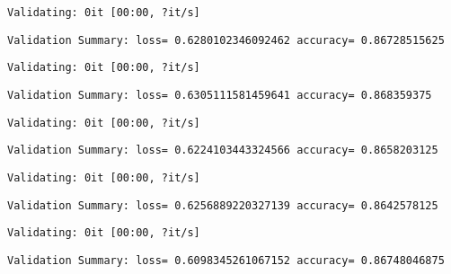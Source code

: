 \documentclass[11pt]{article}
\begin{document}
    
    \begin{Verbatim}[commandchars=\\\{\}]
Validating: 0it [00:00, ?it/s]
    \end{Verbatim}

    
    \begin{Verbatim}[commandchars=\\\{\}]
Validation Summary: loss= 0.6280102346092462 accuracy= 0.86728515625
    \end{Verbatim}

    
    \begin{Verbatim}[commandchars=\\\{\}]
Validating: 0it [00:00, ?it/s]
    \end{Verbatim}

    
    \begin{Verbatim}[commandchars=\\\{\}]
Validation Summary: loss= 0.6305111581459641 accuracy= 0.868359375
    \end{Verbatim}

    
    \begin{Verbatim}[commandchars=\\\{\}]
Validating: 0it [00:00, ?it/s]
    \end{Verbatim}

    
    \begin{Verbatim}[commandchars=\\\{\}]
Validation Summary: loss= 0.6224103443324566 accuracy= 0.8658203125
    \end{Verbatim}

    
    \begin{Verbatim}[commandchars=\\\{\}]
Validating: 0it [00:00, ?it/s]
    \end{Verbatim}

    
    \begin{Verbatim}[commandchars=\\\{\}]
Validation Summary: loss= 0.6256889220327139 accuracy= 0.8642578125
    \end{Verbatim}

    
    \begin{Verbatim}[commandchars=\\\{\}]
Validating: 0it [00:00, ?it/s]
    \end{Verbatim}

    
    \begin{Verbatim}[commandchars=\\\{\}]
Validation Summary: loss= 0.6098345261067152 accuracy= 0.86748046875
    \end{Verbatim}
\end{document}
